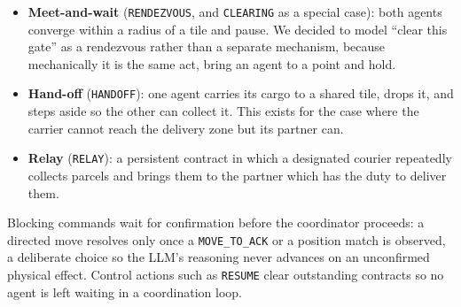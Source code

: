 \begin{itemize}
  \item \textbf{Meet-and-wait} (\texttt{RENDEZVOUS}, and \texttt{CLEARING} as a
        special case): both agents converge within a radius of a tile and pause. We
        decided to model ``clear this gate'' as a rendezvous rather than a separate
        mechanism, because mechanically it is the same act, bring an agent to a point and hold.
  \item \textbf{Hand-off} (\texttt{HANDOFF}): one agent carries its cargo to a shared
        tile, drops it, and steps aside so the other can collect it. This exists for
        the case where the carrier cannot reach the delivery zone but its partner can.
  \item \textbf{Relay} (\texttt{RELAY}): a persistent contract in which a designated
        courier repeatedly collects parcels and brings them to the partner which has the duty to 
        deliver them.
\end{itemize}

Blocking commands wait for confirmation before the coordinator proceeds: a directed
move resolves only once a \texttt{MOVE\_TO\_ACK} or a position match is observed, a
deliberate choice so the LLM's reasoning never advances on an unconfirmed physical
effect. Control actions such as \texttt{RESUME} clear outstanding contracts so no
agent is left waiting in a coordination loop.
